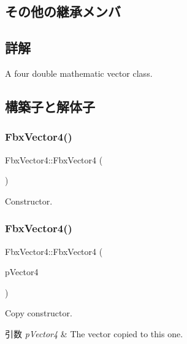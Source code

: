 \subsection*{その他の継承メンバ}


\subsection{詳解}
A four double mathematic vector class. 

\subsection{構築子と解体子}
\mbox{\label{class_fbx_vector4_af346570e3050b36bf11a1cf3d162ed4e}} 
\subsubsection{\texorpdfstring{Fbx\+Vector4()}{FbxVector4()}\hspace{0.1cm}{\footnotesize\ttfamily [1/5]}}
{\footnotesize\ttfamily Fbx\+Vector4\+::\+Fbx\+Vector4 (\begin{DoxyParamCaption}{ }\end{DoxyParamCaption})}



Constructor. 

\mbox{\label{class_fbx_vector4_a87adf6b4cc9e6aa4b81e5067dd3d6102}} 
\subsubsection{\texorpdfstring{Fbx\+Vector4()}{FbxVector4()}\hspace{0.1cm}{\footnotesize\ttfamily [2/5]}}
{\footnotesize\ttfamily Fbx\+Vector4\+::\+Fbx\+Vector4 (\begin{DoxyParamCaption}\item[{const \hyperlink{class_fbx_vector4}{Fbx\+Vector4} \&}]{p\+Vector4 }\end{DoxyParamCaption})}

Copy constructor. 
\begin{DoxyParams}{引数}
{\em p\+Vector4} & The vector copied to this one. \\
\hline
\end{DoxyParams}
\mbox{\label{class_fbx_vector4_a123ea824d4d86519a5f047fa58adca1f}} 
